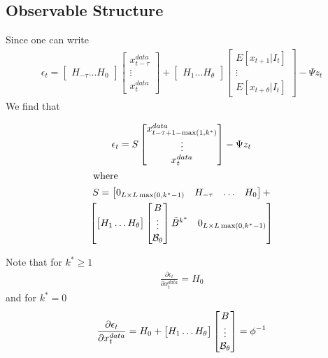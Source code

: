 \documentclass{elsart}
\begin{document}
\subsection{Observable Structure}
\label{sec:obstrucproof}

Since one can write
\begin{gather}
  \epsilon_t =
  \begin{bmatrix}
    H_{-\tau}\ldots H_0
  \end{bmatrix} 
  \begin{bmatrix}
    x^{data}_{t-\tau}\\
\vdots \\ 
   x^{data}_{t}
  \end{bmatrix} +
  \begin{bmatrix}
    H_{1}\ldots H_\theta
  \end{bmatrix} 
  \begin{bmatrix}
    E [x_{t+1} |I_t] \\
\vdots \\
    E [x_{t+\theta}|I_t]
  \end{bmatrix} - \Psi z_t
\end{gather}
We find that

\begin{gather}
  \epsilon_t= S   \begin{bmatrix}
    x^{data}_{t-\tau+1-\max (1,k^\ast)}\\
\vdots \\ 
   x^{data}_{t}
  \end{bmatrix} - \Psi z_t\\ \intertext{ where }
S=   \begin{bmatrix}
0_{L\times L\max (0,k^\ast-1)}&    H_{-\tau}&\ldots&H_0
  \end{bmatrix} +\\
  \begin{bmatrix}
  \begin{bmatrix}
    H_{1}\ldots H_\theta
  \end{bmatrix} 
\begin{bmatrix}
      B\\\vdots\\\mathcal{B}_{\theta}
    \end{bmatrix}
 \tilde{B}^{k^\ast}
   & 0_{L\times L\max (0,k^\ast-1)}
  \end{bmatrix}
\end{gather}

Note that for $k^\ast \ge 1$
\begin{gather}
  \frac{\partial \epsilon_t}{\partial x^{data}_t} = H_0
\end{gather}
and for $k^\ast = 0$
\begin{gather}
  \frac{\partial \epsilon_t}{\partial x^{data}_t} = H_0 +   \begin{bmatrix}
    H_{1}\ldots H_\theta
  \end{bmatrix} \begin{bmatrix}
      B\\\vdots\\\mathcal{B}_{\theta}
    \end{bmatrix} = \phi^{-1}
\end{gather}
\end{document}
